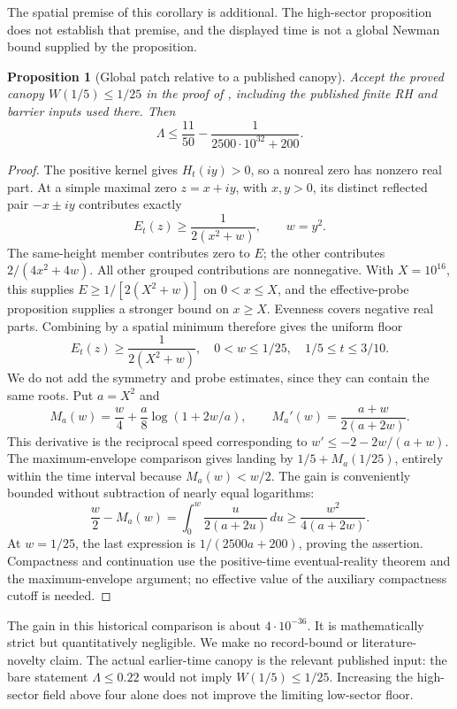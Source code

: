 \documentclass[11pt]{article}
\numberwithin{equation}{section}
\newtheorem{proposition}[theorem]{Proposition}
\theoremstyle{definition}
\theoremstyle{remark}
\begin{document}
The spatial premise of this corollary is additional.  The high-sector
proposition does not establish that premise, and the displayed time is not
a global Newman bound supplied by the proposition.

\begin{proposition}[Global patch relative to a published canopy]
Accept the proved canopy \(W(1/5)\le1/25\) in the proof of
\cite[Proposition~3.3 and Section~8]{polymath}, including the published
finite RH and barrier inputs used there.  Then
\[
 \Lambda\le\frac{11}{50}
      -\frac1{2500\cdot10^{32}+200}.
\]
\end{proposition}
\begin{proof}
The positive kernel gives \(H_t(iy)>0\), so a nonreal zero has nonzero
real part.  At a simple maximal zero \(z=x+iy\), with \(x,y>0\), its
distinct reflected pair \(-x\pm iy\) contributes exactly
\[
 E_t(z)\ge\frac1{2(x^2+w)},\qquad w=y^2.
\]
The same-height member contributes zero to \(E\); the other contributes
\(2/(4x^2+4w)\).  All other grouped contributions are nonnegative.
With \(X=10^{16}\), this supplies
\(E\ge1/[2(X^2+w)]\) on \(0<x\le X\), and the effective-probe
proposition supplies a stronger bound on \(x\ge X\).
Evenness covers negative real parts.  Combining by a spatial minimum
therefore gives the uniform floor
\[
 E_t(z)\ge\frac1{2(X^2+w)},\quad
 0<w\le1/25,\quad 1/5\le t\le3/10.
\]
We do not add the symmetry and probe estimates, since they can contain
the same roots.  Put \(a=X^2\) and
\[
 M_a(w)=\frac w4+\frac a8\log(1+2w/a),\qquad
 M_a'(w)=\frac{a+w}{2(a+2w)}.
\]
This derivative is the reciprocal speed corresponding to
\(w'\le-2-2w/(a+w)\).  The maximum-envelope comparison gives landing
by \(1/5+M_a(1/25)\), entirely within the time interval because
\(M_a(w)<w/2\).  The gain is conveniently bounded without subtraction
of nearly equal logarithms:
\[
 \frac w2-M_a(w)=\int_0^w\frac{u}{2(a+2u)}\,du
 \ge\frac{w^2}{4(a+2w)}.
\]
At \(w=1/25\), the last expression is \(1/(2500a+200)\), proving
the assertion.  Compactness and continuation use the positive-time
eventual-reality theorem and the maximum-envelope argument; no effective
value of the auxiliary compactness cutoff is needed.
\end{proof}

The gain in this historical comparison is about \(4\cdot10^{-36}\).
It is mathematically strict but quantitatively negligible.  We make no
record-bound or literature-novelty claim.  The actual earlier-time canopy
is the relevant published input: the bare statement \(\Lambda\le0.22\)
would not imply \(W(1/5)\le1/25\).  Increasing the high-sector field
above four alone does not improve the limiting low-sector floor.
\end{document}
